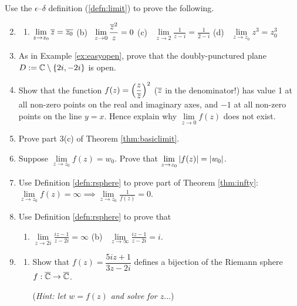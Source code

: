 \begin{exercises}{}{}
	\exstart Use the $\epsilon$--$\delta$ definition (\ref{defn:limit}) to prove the following.
	\begin{enumerate}\setcounter{enumi}{1}
	  \item[]\begin{enumerate}
	  	\item $\displaystyle\lim\limits_{z\to z_0}\overline{z}=\overline{z_0}$\qquad
	  	(b) \ $\displaystyle\lim\limits_{z\to 0}\frac{\overline{z}^2}z=0$\qquad
	  	(c) \ $\displaystyle\lim\limits_{z\to 2}\frac 1{z-i}=\frac 1{2-i}$\qquad
	  	(d) \ $\displaystyle\lim\limits_{z\to z_0}z^3=z_0^3$
	  \end{enumerate}
	  
	  
	  \item As in Example \ref{ex:easyopen}, prove that the doubly-punctured plane $D:=\mathbb{C}\setminus\{2i,-2i\}$ is open.
	  
	  \item Show that the function $f(z)=\left(\dfrac z{\overline{z}}\right)^2$ ($\overline{z}$ in the denominator!) has value 1 at all non-zero points on the real and imaginary axes, and $-1$ at all non-zero points on the line $y=x$. Hence explain why $\lim\limits_{z\to 0}f(z)$ does not exist.
	  
	  
	  \item Prove part 3(c) of Theorem \ref{thm:basiclimit}.
	  
	  
	  \item Suppose $\lim\limits_{z\to z_0}f(z)=w_0$. Prove that $\lim\limits_{z\to z_0}\left| f(z)\right|=\left| w_0\right|$.
	   
	   
	  \item Use Definition \ref{defn:rsphere} to prove part of Theorem \ref{thm:infty}: $\lim\limits_{z\to z_0}f(z)=\infty \implies \lim\limits_{z\to z_0}\frac 1{f(z)}=0$.
	  
	  
	  \item Use Definition \ref{defn:rsphere} to prove that
	  \begin{enumerate}
	    \item $\displaystyle\lim\limits_{z\to 2i}\frac{iz-1}{z-2i}=\infty$ \qquad (b) \ $\displaystyle\lim\limits_{z\to\infty}\frac{iz-1}{z-2i}=i$.
	  \end{enumerate}
	  
	  
	 	\item\begin{enumerate}
	    \item Show that $f(z)=\dfrac{5iz+1}{3z-2i}$ defines a bijection of the Riemann sphere $f:\overline{\mathbb{C}}\to\overline{\mathbb{C}}$.\par
	  	(\emph{Hint: let $w=f(z)$ and solve for $z\ldots$})
	  	

\end{enumerate}
\end{enumerate}
\end{exercises}
